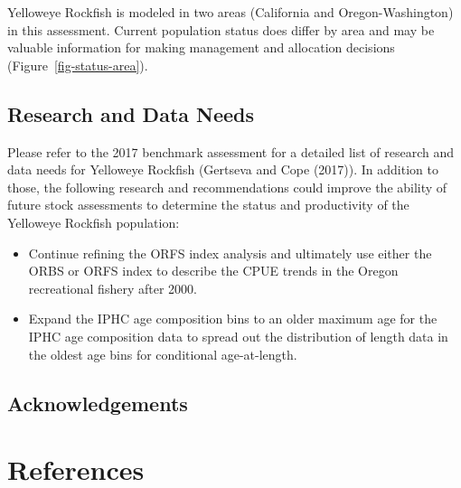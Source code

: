\documentclass[
]{scrartcl}
\providecommand{\tightlist}{%
  \setlength{\itemsep}{0pt}\setlength{\parskip}{0pt}}\usepackage{longtable,booktabs,array}
\begin{document}
Yelloweye Rockfish is modeled in two areas (California and
Oregon-Washington) in this assessment. Current population status does
differ by area and may be valuable information for making management and
allocation decisions (Figure~\ref{fig-status-area}).

\subsection{Research and Data Needs}\label{research-and-data-needs-1}

Please refer to the 2017 benchmark assessment for a detailed list of
research and data needs for Yelloweye Rockfish (Gertseva and Cope
(2017)). In addition to those, the following research and
recommendations could improve the ability of future stock assessments to
determine the status and productivity of the Yelloweye Rockfish
population:

\begin{itemize}
\tightlist
\item
  Continue refining the ORFS index analysis and ultimately use either
  the ORBS or ORFS index to describe the CPUE trends in the Oregon
  recreational fishery after 2000.
\item
  Expand the IPHC age composition bins to an older maximum age for the
  IPHC age composition data to spread out the distribution of length
  data in the oldest age bins for conditional age-at-length.
\end{itemize}

\newpage{}

\subsection{Acknowledgements}\label{sec-acknowledgements}

\newpage{}

\section{References}\label{references}
\end{document}
